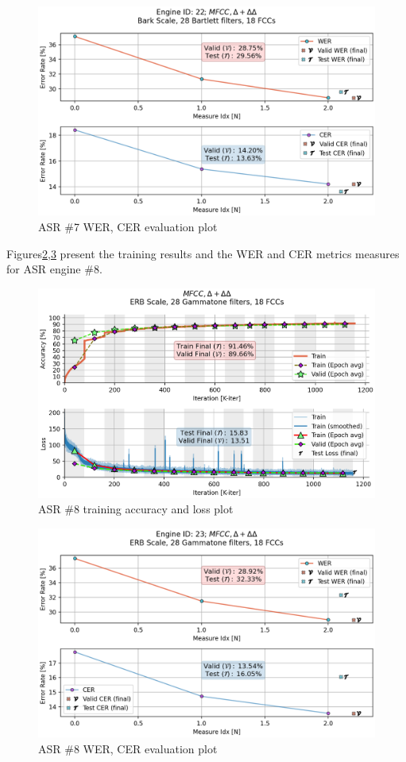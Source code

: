 \begin{figure}[H]
    \centering
    \includegraphics[width=0.95\linewidth]{ASR/images/asr22_wer.png}
    \caption{ASR \#7 WER, CER evaluation plot}\label{fig:wer_22}
\end{figure}

Figures\;\ref{fig:asr_23},\;\ref{fig:wer_23}
present the training results and the WER and CER
metrics measures for ASR engine \#8.

\begin{figure}[H]
    \centering
    \includegraphics[width=0.95\linewidth]{Experiments/images/asr_23}
    \caption{ASR \#8 training accuracy and loss plot}\label{fig:asr_23}
\end{figure}

\begin{figure}[H]
    \centering
    \includegraphics[width=0.95\linewidth]{ASR/images/asr23_wer.png}
    \caption{ASR \#8 WER, CER evaluation plot}\label{fig:wer_23}
\end{figure}

